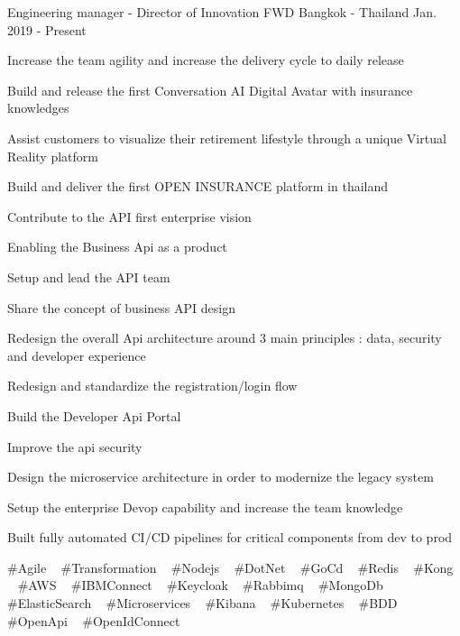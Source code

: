 

\begin{cventries}

  \cventry
    {Engineering manager - Director of Innovation} %
    {FWD} %
    {Bangkok - Thailand} %
    {Jan. 2019 - Present} %
    {
      \begin{cvitems} %
        \item {Increase the team agility and increase the delivery cycle to daily release}
        \item {Build and release the first Conversation AI Digital Avatar with insurance knowledges}
        \item {Assist customers to visualize their retirement lifestyle through a unique Virtual Reality platform}
        \item {Build and deliver the first OPEN INSURANCE platform in thailand}
        \item {Contribute to the API first enterprise vision}
        \item {Enabling the Business Api as a product}
        \item {Setup and lead the API team}
        \item {Share the concept of business API design}
        \item {Redesign the overall Api architecture around 3 main principles : data, security and developer experience}
        \item {Redesign and standardize the registration/login flow}
        \item {Build the Developer Api Portal}
        \item {Improve the api security}
        \item {Design the microservice architecture in order to modernize the legacy system}
        \item {Setup the enterprise Devop capability and increase the team knowledge}
        \item {Built fully automated CI/CD pipelines for critical components from dev to prod}
      \end{cvitems}
    }
    {
      \#Agile ~
      \#Transformation ~
      \#Nodejs ~
      \#DotNet ~
      \#GoCd ~
      \#Redis ~
      \#Kong ~
      \#AWS ~
      \#IBMConnect ~
      \#Keycloak ~
      \#Rabbimq ~
      \#MongoDb ~
      \#ElasticSearch ~
      \#Microservices ~
      \#Kibana ~
      \#Kubernetes ~
      \#BDD
      \#OpenApi ~
      \#OpenIdConnect ~
    }


\end{cventries}
